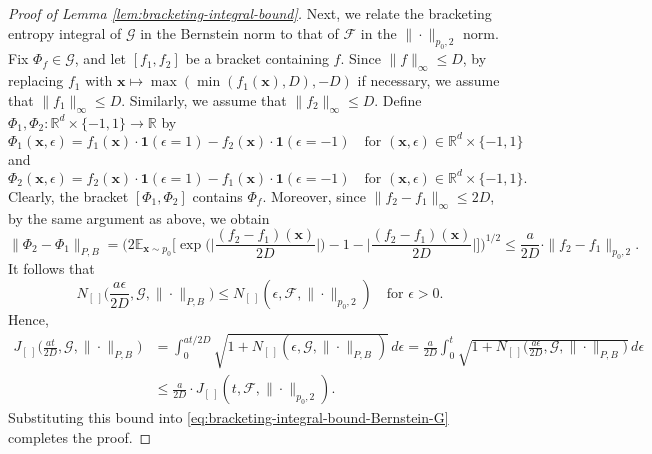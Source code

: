 \documentclass[10pt]{article}
\newcommand{\E}{{\mathbb E}}
\newcommand{\F}{{\mathcal{F}}}
\newcommand{\G}{{\mathcal{G}}}
\newcommand{\R}{{\mathbb R}}
\newcommand{\xbf}{{\mathbf{x}}}
\newcommand{\ind}{{\mathbf{1}}}
\begin{document}
\begin{proof}[Proof of Lemma \ref{lem:bracketing-integral-bound}]
Next, we relate the bracketing entropy integral of $\G$ in the Bernstein norm 
to that of $\F$ in the $\|\cdot\|_{p_0, 2}$ norm.
Fix $\Phi_f \in \G$, and let $[f_1, f_2]$ be a bracket containing $f$. 
Since $\|f\|_{\infty} \le D$, 
by replacing $f_1$ with $\xbf \mapsto \max(\min(f_1(\xbf), D), -D)$ 
if necessary, we assume that $\|f_1\|_{\infty} \le D$.
Similarly, we assume that $\|f_2\|_{\infty} \le D$.
Define $\Phi_1,\Phi_2:\R^d \times \{-1, 1\} \to \R$ by
\begin{equation*}
    \Phi_1(\xbf, \epsilon) = f_1(\xbf) \cdot \ind(\epsilon = 1) 
    - f_2(\xbf) \cdot \ind(\epsilon = -1) 
    \quad \text{for } (\xbf, \epsilon) \in \R^d \times \{-1, 1\}
\end{equation*}
and
\begin{equation*}
    \Phi_2(\xbf, \epsilon) = f_2(\xbf) \cdot \ind(\epsilon = 1) 
    - f_1(\xbf) \cdot \ind(\epsilon = -1)
    \quad \text{for } (\xbf, \epsilon) \in \R^d \times \{-1, 1\}.
\end{equation*}
Clearly, the bracket $[\Phi_1, \Phi_2]$ contains $\Phi_f$.
Moreover, since $\|f_2 - f_1\|_{\infty} \le 2D$, by the same argument as
above, we obtain
\begin{equation*}
    \|\Phi_2 - \Phi_1\|_{P, B} 
    = \bigg(2\E_{\xbf \sim p_0} 
    \Big[\exp\Big(\Big|\frac{(f_2 - f_1)(\xbf)}{2D}\Big|\Big)
    - 1 - \Big|\frac{(f_2 - f_1)(\xbf)}{2D}\Big|\Big]\bigg)^{1/2} 
    \le \frac{a}{2D} \cdot \|f_2 - f_1\|_{p_0, 2}.
\end{equation*}
It follows that
\begin{equation*}
    N_{[ \ ]}\Big(\frac{a\epsilon}{2D}, \G, \| \cdot \|_{P, B}\Big) 
    \le N_{[ \ ]}(\epsilon, \F, \| \cdot \|_{p_0, 2}) 
    \quad \text{for } \epsilon > 0.
\end{equation*}
Hence, 
\begin{equation*}
\begin{aligned}
    J_{[ \ ]}\Big(\frac{a t}{2D}, \G, \| \cdot \|_{P, B}\Big) 
    &= \int_{0}^{at/2D} \sqrt{1 + N_{[ \ ]}(\epsilon, \G, 
    \| \cdot \|_{P, B})} \, d\epsilon 
    = \frac{a}{2D} \int_{0}^{t} \sqrt{1 
    + N_{[ \ ]}\Big(\frac{a\epsilon}{2D}, 
    \G, \| \cdot \|_{P, B}\Big)} \, d\epsilon \\
    &\le \frac{a}{2D} \cdot J_{[ \ ]}(t, \F, \| \cdot \|_{p_0, 2}).
\end{aligned}
\end{equation*}
Substituting this bound into \eqref{eq:bracketing-integral-bound-Bernstein-G} 
completes the proof.
\end{proof}
\end{document}
